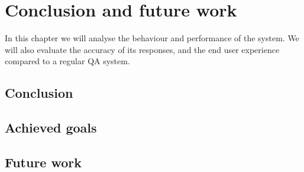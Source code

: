 \chapter{Conclusion and future work}

\begin{chapterintro}

In this chapter we will analyse the behaviour and performance of the system. We will also evaluate the accuracy of its responses, and the end user experience compared to a regular \ac{QA} system.
 
\end{chapterintro}

\cleardoublepage

\section{Conclusion}

\section{Achieved goals}

\section{Future work}